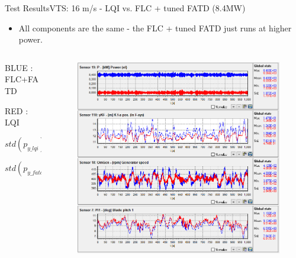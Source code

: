 \begin{frame}{Test Results}{VTS: 16 m/s - LQI vs. FLC + tuned FATD (8.4MW)}
	\begin{itemize}
		\item \small{All components are the same - the FLC + tuned FATD just runs at higher power.}
	\end{itemize}
	\begin{columns}
		\begin{column}{.25\linewidth}
			\small{BLUE}
			\small{: FLC+FATD}
			
			\smallskip
			\small{RED}
			\small{: LQI}
			
			\medskip
			\small{$std(p_{y\_lqi}) = .47$}
			
			\small{$std(p_{y\_fatd}) = .76$}
		\end{column}
	
		\begin{column}{.75\linewidth}
			\begin{figure}[h]
				\centering
				\includegraphics[width=0.98\linewidth]{Graphics/brmrcCompare.PNG}
				\label{fig:brmrc_comparison}
			\end{figure}
		\end{column}
	\end{columns}	
\end{frame}


